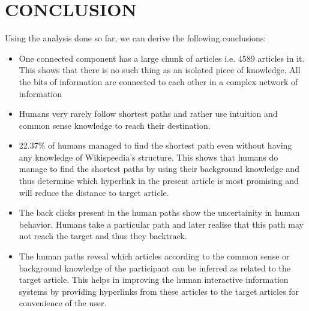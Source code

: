 \documentclass{article}
\begin{document}
\section{CONCLUSION}
Using the analysis done so far, we can derive the following conclusions:
\begin{itemize}
    \item One connected component has a large chunk of articles i.e. 4589 articles in it. This shows that there is no such thing as an isolated piece of knowledge. All the bits of information are connected to each other in a complex network of information
    \item Humans very rarely follow shortest paths and rather use intuition and common sense knowledge to reach their destination.
    \item 22.37\% of humans managed to find the shortest path even without having any knowledge of Wikispeedia's structure. This shows that humans do manage to find the shortest paths by using their background knowledge and thus determine which hyperlink in the present article is most promising and will reduce the distance to target article.
    \item The back clicks present in the human paths show the uncertainity in human behavior. Humans take a particular path and later realise that this path may not reach the target and thus they backtrack.
    \item The human paths reveal which articles according to the common sense or background knowledge of the participant can be inferred as related to the target article. This helps in improving the human interactive information systems by providing hyperlinks from these articles to the target articles for convenience of the user. 
    \end{itemize}
\end{document}
